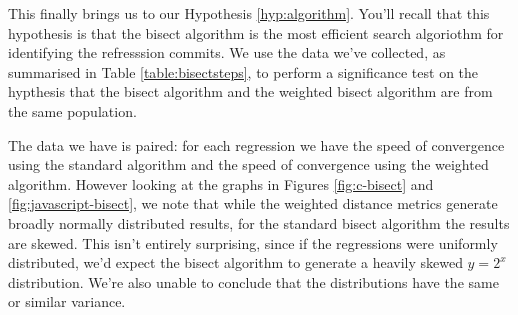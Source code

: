 \documentclass[10pt,journal,compsoc]{IEEEtran}
\begin{document}
\begin{figure*}[t]
\centering
{}
\hfil
{}
\hfil
{}
\hfil
{}
\caption{\label{fig:c-bisect}Histograms for the C language of the number of steps required to complete the bisect algorithm using (a) the standard metrix; (b) the weighted commit metric; (c) the weighted lines changed metric; (d) the weighted hunks changed metric. The dashed line indicates the mean, the dotted lines a one-standard-deviation interval on each side it.}
\end{figure*}

\begin{figure*}[t]
\centering
{}
\hfil
{}
\hfil
{}
\hfil
{}
\caption{\label{fig:javascript-bisect}Histograms for the JavaScript language of the number of steps required to complete the bisect algorithm using (a) the standard metrix; (b) the weighted commit metric; (c) the weighted lines changed metric; (d) the weighted hunks changed metric. The dashed line indicates the mean, the dotted lines a one-standard-deviation interval on each side it.}
\end{figure*}

This finally brings us to our Hypothesis \ref{hyp:algorithm}. You'll recall that this hypothesis is that the bisect algorithm is the most efficient search algoriothm for identifying the refresssion commits. We use the data we've collected, as summarised in Table \ref{table:bisectsteps}, to perform a significance test on the hypthesis that the bisect algorithm and the weighted bisect algorithm are from the same population.

The data we have is paired: for each regression we have the speed of convergence using the standard algorithm and the speed of convergence using the weighted algorithm. However looking at the graphs in Figures \ref{fig:c-bisect} and \ref{fig:javascript-bisect}, we note that while the weighted distance metrics generate broadly normally distributed results, for the standard bisect algorithm the results are skewed. This isn't entirely surprising, since if the regressions were uniformly distributed, we'd expect the bisect algorithm to generate a heavily skewed $y = 2^x$ distribution. We're also unable to conclude that the distributions have the same or similar variance.
\end{document}
